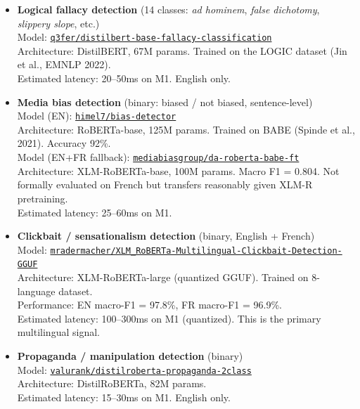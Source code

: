 \begin{itemize}

  \item \textbf{Logical fallacy detection} (14 classes: \textit{ad hominem}, \textit{false dichotomy}, \textit{slippery slope}, etc.)\\
    Model: \href{https://huggingface.co/q3fer/distilbert-base-fallacy-classification}{\texttt{q3fer/distilbert-base-fallacy-classification}}\\
    Architecture: DistilBERT, 67M params. Trained on the LOGIC dataset (Jin et al., EMNLP 2022).\\
    Estimated latency: 20--50ms on M1. English only.

  \item \textbf{Media bias detection} (binary: biased / not biased, sentence-level)\\
    Model (EN): \href{https://huggingface.co/himel7/bias-detector}{\texttt{himel7/bias-detector}}\\
    Architecture: RoBERTa-base, 125M params. Trained on BABE (Spinde et al., 2021). Accuracy 92\%.\\
    Model (EN+FR fallback): \href{https://huggingface.co/mediabiasgroup/da-roberta-babe-ft}{\texttt{mediabiasgroup/da-roberta-babe-ft}}\\
    Architecture: XLM-RoBERTa-base, 100M params. Macro F1 = 0.804. Not formally evaluated on French but transfers reasonably given XLM-R pretraining.\\
    Estimated latency: 25--60ms on M1.

  \item \textbf{Clickbait / sensationalism detection} (binary, English + French)\\
    Model: \href{https://huggingface.co/mradermacher/XLM_RoBERTa-Multilingual-Clickbait-Detection-GGUF}{\texttt{mradermacher/XLM\_RoBERTa-Multilingual-Clickbait-Detection-GGUF}}\\
    Architecture: XLM-RoBERTa-large (quantized GGUF). Trained on 8-language dataset.\\
    Performance: EN macro-F1 = 97.8\%, FR macro-F1 = 96.9\%.\\
    Estimated latency: 100--300ms on M1 (quantized). This is the primary multilingual signal.

  \item \textbf{Propaganda / manipulation detection} (binary)\\
    Model: \href{https://huggingface.co/valurank/distilroberta-propaganda-2class}{\texttt{valurank/distilroberta-propaganda-2class}}\\
    Architecture: DistilRoBERTa, 82M params.\\
    Estimated latency: 15--30ms on M1. English only.


\end{itemize}
